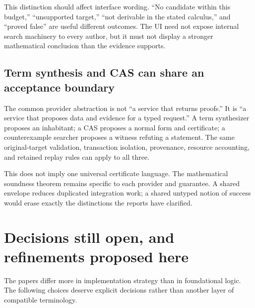 \documentclass[11pt,letterpaper]{article}
\begin{document}
This distinction should affect interface wording. ``No candidate within this
budget,'' ``unsupported target,'' ``not derivable in the stated calculus,'' and
``proved false'' are useful different outcomes. The UI need not expose internal
search machinery to every author, but it must not display a stronger
mathematical conclusion than the evidence supports.

\subsection{Term synthesis and CAS can share an acceptance boundary}
The common provider abstraction is not ``a service that returns proofs.'' It is
``a service that proposes data and evidence for a typed request.'' A term
synthesizer proposes an inhabitant; a CAS proposes a normal form and certificate;
a counterexample searcher proposes a witness refuting a statement. The same
original-target validation, transaction isolation, provenance, resource
accounting, and retained replay rules can apply to all three.

This does not imply one universal certificate language. The mathematical
soundness theorem remains specific to each provider and guarantee. A shared
envelope reduces duplicated integration work; a shared untyped notion of
success would erase exactly the distinctions the reports have clarified.

\section{Decisions still open, and refinements proposed here}\label{sec:decisions}
The papers differ more in implementation strategy than in foundational logic.
The following choices deserve explicit decisions rather than another layer of
compatible terminology.
\end{document}
